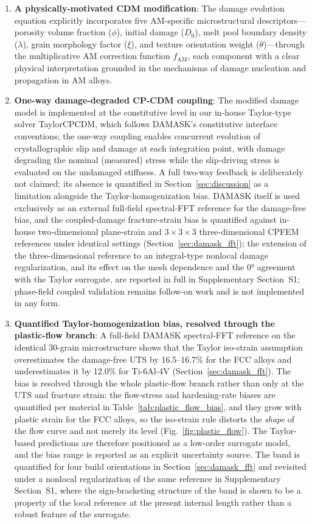 \documentclass[12pt,a4paper,twocolumn]{article}
\begin{document}
\begin{enumerate}
    \item \textbf{A physically-motivated CDM modification}: The damage evolution equation explicitly incorporates five AM-specific microstructural descriptors---porosity volume fraction ($\phi$), initial damage ($D_0$), melt pool boundary density ($\lambda$), grain morphology factor ($\xi$), and texture orientation weight ($\theta$)---through the multiplicative AM correction function $f_{\text{AM}}$, each component with a clear physical interpretation grounded in the mechanisms of damage nucleation and propagation in AM alloys.
    
    \item \textbf{One-way damage-degraded CP-CDM coupling}: The modified damage model is implemented at the constitutive level in our in-house Taylor-type solver TaylorCPCDM, which follows DAMASK's constitutive interface conventions; the one-way coupling enables concurrent evolution of crystallographic slip and damage at each integration point, with damage degrading the nominal (measured) stress while the slip-driving stress is evaluated on the undamaged stiffness. A full two-way feedback is deliberately not claimed; its absence is quantified in Section~\ref{sec:discussion} as a limitation alongside the Taylor-homogenization bias. DAMASK itself is used exclusively as an external full-field spectral-FFT reference for the damage-free bias, and the coupled-damage fracture-strain bias is quantified against in-house two-dimensional plane-strain and $3\times3\times3$ three-dimensional CPFEM references under identical settings (Section~\ref{sec:damask_fft}); the extension of the three-dimensional reference to an integral-type nonlocal damage regularization, and its effect on the mesh dependence and the $\ang{0}$ agreement with the Taylor surrogate, are reported in full in Supplementary Section~S1; phase-field coupled validation remains follow-on work and is not implemented in any form.
    
    \item \textbf{Quantified Taylor-homogenization bias, resolved through the plastic-flow branch}: A full-field DAMASK spectral-FFT reference on the identical 30-grain microstructure shows that the Taylor iso-strain assumption overestimates the damage-free UTS by 16.5--16.7\% for the FCC alloys and underestimates it by 12.0\% for Ti-6Al-4V (Section~\ref{sec:damask_fft}). The bias is resolved through the whole plastic-flow branch rather than only at the UTS and fracture strain: the flow-stress and hardening-rate biases are quantified per material in Table~\ref{tab:plastic_flow_bias}, and they grow with plastic strain for the FCC alloys, so the iso-strain rule distorts the \emph{shape} of the flow curve and not merely its level (Fig.~\ref{fig:plastic_flow}). The Taylor-based predictions are therefore positioned as a low-order surrogate model, and the bias range is reported as an explicit uncertainty source. The band is quantified for four build orientations in Section~\ref{sec:damask_fft} and revisited under a nonlocal regularization of the same reference in Supplementary Section~S1, where the sign-bracketing structure of the band is shown to be a property of the local reference at the present internal length rather than a robust feature of the surrogate.
    

\end{enumerate}
\end{document}
